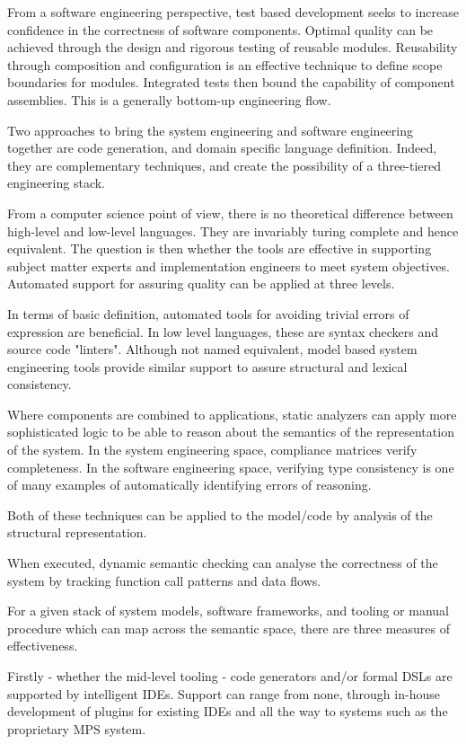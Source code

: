 \documentclass[5p]{elsarticle}
\begin{document}
From a software engineering perspective, test based development seeks
to increase confidence in the correctness of software components.
Optimal quality can be achieved through the design and rigorous testing
of reusable modules.  Reusability through composition and configuration
is an effective technique to define scope boundaries for modules.
Integrated tests then bound the capability of component assemblies.
This is a generally bottom-up engineering flow.

Two approaches to bring the system engineering and software engineering
together are code generation, and domain specific language definition.
Indeed, they are complementary techniques, and create the possibility
of a three-tiered engineering stack.

From a computer science point of view, there is no theoretical difference
between high-level and low-level languages.  They are invariably
turing complete and hence equivalent. The question is then whether the
tools are effective in supporting subject matter experts and 
implementation engineers to meet system objectives.
Automated support for assuring quality can be applied at three
levels.

In terms of basic definition, automated tools for avoiding trivial errors of expression
are beneficial.  In low level languages, these are syntax checkers
and source code "linters".  Although not named equivalent, model
based system engineering tools provide similar support to assure
structural and lexical consistency.

Where components are combined to applications,
static analyzers can apply more sophisticated logic to
be able to reason about the semantics of the representation
of the system.  In the system engineering space, compliance 
matrices verify completeness.  In the software engineering
space, verifying type consistency is one of many examples
of automatically identifying errors of reasoning.

Both of these techniques can be applied to the model/code
by analysis of the structural representation.

When executed, dynamic semantic checking can analyse the 
correctness of the system by tracking function call
patterns and data flows.

For a given stack of system models, 
software frameworks, and tooling or manual procedure which
can map across the semantic space, there are three
measures of effectiveness.

Firstly - whether the mid-level tooling - code generators and/or formal
DSLs are supported by intelligent IDEs.  Support can range from none,
through in-house development of plugins for existing IDEs and all the
way to systems such as the proprietary MPS system.
\end{document}
